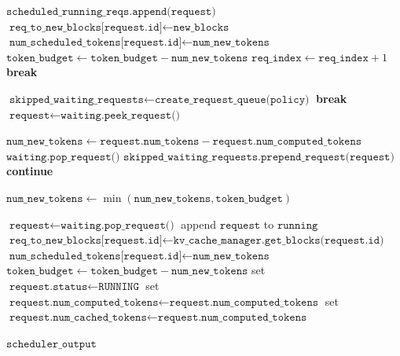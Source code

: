 \begin{algorithmic}[1]
    \State \(\texttt{scheduled\_running\_reqs.append(request)}\)
    \State \(\texttt{req\_to\_new\_blocks[request.id]} \leftarrow \texttt{new\_blocks}\)
    \State \(\texttt{num\_scheduled\_tokens[request.id]} \leftarrow \texttt{num\_new\_tokens}\)
    \State \(\texttt{token\_budget} \leftarrow \texttt{token\_budget} - \texttt{num\_new\_tokens}\)
    \State \(\texttt{req\_index} \leftarrow \texttt{req\_index} + 1\)
  \Else
    \State \textbf{break} 
  \EndIf
\EndWhile

\medskip
{}
\State \(\texttt{skipped\_waiting\_requests} \leftarrow \texttt{create\_request\_queue(policy)}\)
     \State \textbf{break} \EndIf
    \State \(\texttt{request} \leftarrow \texttt{waiting.peek\_request()}\)

    \State \(\texttt{num\_new\_tokens} \leftarrow \texttt{request.num\_tokens} - \texttt{request.num\_computed\_tokens}\)
      \State \(\texttt{waiting.pop\_request()}\)
      \State \(\texttt{skipped\_waiting\_requests.prepend\_request(request)}\)
      \State \textbf{continue}
    \EndIf

    \State \(\texttt{num\_new\_tokens} \leftarrow \min(\texttt{num\_new\_tokens}, \texttt{token\_budget})\)


    \State \(\texttt{request} \leftarrow \texttt{waiting.pop\_request()}\)
    \State append \(\texttt{request}\) to \(\texttt{running}\)
    \State \(\texttt{req\_to\_new\_blocks[request.id]} \leftarrow
           \texttt{kv\_cache\_manager.get\_blocks(request.id)}\)
    \State \(\texttt{num\_scheduled\_tokens[request.id]} \leftarrow \texttt{num\_new\_tokens}\)
    \State \(\texttt{token\_budget} \leftarrow \texttt{token\_budget} - \texttt{num\_new\_tokens}\)
    \State set \(\texttt{request.status} \leftarrow \texttt{RUNNING}\)
    \State set \(\texttt{request.num\_computed\_tokens} \leftarrow \texttt{request.num\_computed\_tokens}\)
      \State set \(\texttt{request.num\_cached\_tokens} \leftarrow \texttt{request.num\_computed\_tokens}\)
    \EndIf
  \EndWhile
\EndIf


\State \Return \(\texttt{scheduler\_output}\)
\end{algorithmic}
